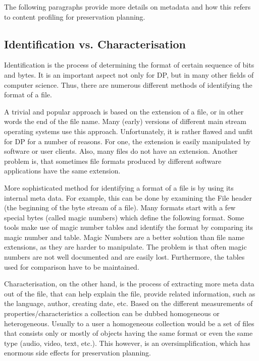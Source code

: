 The following paragraphs provide more details on metadata and how this refers to content profiling for preservation planning.

\subsection{Identification vs. Characterisation}
Identification is the process of determining the format of certain sequence of bits and bytes. It is an important aspect not only for DP, but in many other fields of computer science. Thus, there are numerous different methods of identifying the format of a file.

A trivial and popular approach is based on the extension of a file, or in other words the end of the file name. Many (early) versions of different main stream operating systems use this approach. Unfortunately, it is rather flawed and unfit for DP for a number of reasons. For one, the extension is easily manipulated by software or user clients. Also, many files do not have an extension. Another problem is, that sometimes file formats produced by different software applications have the same extension.

More sophisticated method for identifying a format of a file is by using its internal meta data. For example, this can be done by examining the File header (the beginning of the byte stream of a file). Many formats start with a few special bytes (called magic numbers) which define the following format. Some tools make use of magic number tables and identify the format by comparing its magic number and table. Magic Numbers are a better solution than file name extensions, as they are harder to manipulate. The problem is that often magic numbers are not well documented and are easily lost. Furthermore, the tables used for comparison have to be maintained.

Characterisation, on the other hand, is the process of extracting more meta data out of the file, that can help explain the file, provide related information, such as the language, author, creating date, etc. Based on the different measurements of properties/characteristics a collection can be dubbed homogeneous or heterogeneous. Usually to a user a homogeneous collection would be a set of files that consists only or mostly of objects having the same format or even the same type (audio, video, text, etc.). This however, is an oversimplification, which has enormous side effects for preservation planning.

